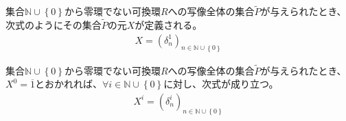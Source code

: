 \documentclass[dvipdfmx]{jsarticle}
\begin{document}
\begin{dfn}
集合$\mathbb{N} \cup \left\{ 0 \right\}$から零環でない可換環$R$への写像全体の集合$\widetilde{P}$が与えられたとき、次式のようにその集合$\widetilde{P}$の元$X$が定義される。
\begin{align*}
X = \left( \delta_{n}^{1} \right)_{n \in \mathbb{N} \cup \left\{ 0 \right\}}
\end{align*}
\end{dfn}
\begin{thm}\label{3.3.3.2}
集合$\mathbb{N} \cup \left\{ 0 \right\}$から零環でない可換環$R$への写像全体の集合$\widetilde{P}$が与えられたとき、$X^{0} = \overline{1}$とおかれれば、$\forall i \in \mathbb{N} \cup \left\{ 0 \right\}$に対し、次式が成り立つ。
\begin{align*}
X^{i} = \left( \delta_{n}^{i} \right)_{n \in \mathbb{N} \cup \left\{ 0 \right\}}
\end{align*}
\end{thm}
\end{document}
